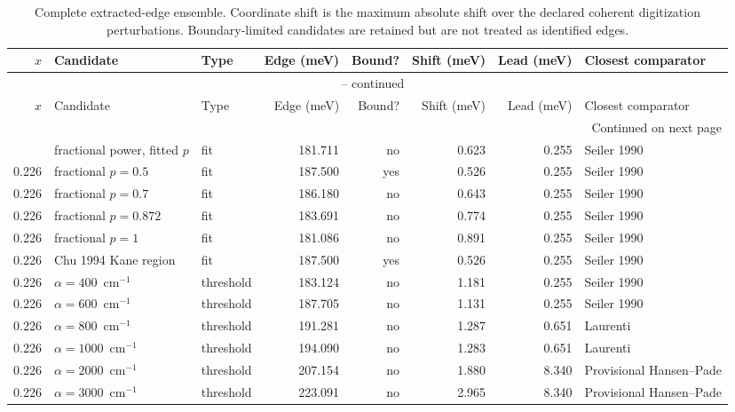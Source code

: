 \begin{landscape}
\begingroup
\scriptsize
\renewcommand{\arraystretch}{0.95}
\setlength{\tabcolsep}{3pt}
\setlength{\LTleft}{0pt}
\setlength{\LTright}{0pt}
\begin{longtable}{@{}rp{1.70in}p{0.65in}rrrrp{1.50in}@{}}
\caption{Complete extracted-edge ensemble. Coordinate shift is the maximum absolute shift over the declared coherent digitization perturbations. Boundary-limited candidates are retained but are not treated as identified edges.}\label{tab:edge-ensemble}\\
\toprule
$x$ & Candidate & Type & Edge (meV) & Bound? & Shift (meV) & Lead (meV) & Closest comparator \\
\midrule
\endfirsthead
\multicolumn{8}{c}{\tablename\ \thetable{} -- continued}\\
\toprule
$x$ & Candidate & Type & Edge (meV) & Bound? & Shift (meV) & Lead (meV) & Closest comparator \\
\midrule
\endhead
\midrule
\multicolumn{8}{r}{Continued on next page}\\
\endfoot
\bottomrule
\endlastfoot
0.226 & fractional power, fitted $p$ & fit & 181.711 & no & 0.623 & 0.255 & Seiler 1990 \\
0.226 & fractional $p=0.5$ & fit & 187.500 & yes & 0.526 & 0.255 & Seiler 1990 \\
0.226 & fractional $p=0.7$ & fit & 186.180 & no & 0.643 & 0.255 & Seiler 1990 \\
0.226 & fractional $p=0.872$ & fit & 183.691 & no & 0.774 & 0.255 & Seiler 1990 \\
0.226 & fractional $p=1$ & fit & 181.086 & no & 0.891 & 0.255 & Seiler 1990 \\
0.226 & Chu 1994 Kane region & fit & 187.500 & yes & 0.526 & 0.255 & Seiler 1990 \\
0.226 & $\alpha=400$~cm$^{-1}$ & threshold & 183.124 & no & 1.181 & 0.255 & Seiler 1990 \\
0.226 & $\alpha=600$~cm$^{-1}$ & threshold & 187.705 & no & 1.131 & 0.255 & Seiler 1990 \\
0.226 & $\alpha=800$~cm$^{-1}$ & threshold & 191.281 & no & 1.287 & 0.651 & Laurenti \\
0.226 & $\alpha=1000$~cm$^{-1}$ & threshold & 194.090 & no & 1.283 & 0.651 & Laurenti \\
0.226 & $\alpha=2000$~cm$^{-1}$ & threshold & 207.154 & no & 1.880 & 8.340 & Provisional Hansen--Pade \\
0.226 & $\alpha=3000$~cm$^{-1}$ & threshold & 223.091 & no & 2.965 & 8.340 & Provisional Hansen--Pade \\

\end{longtable}
\end{landscape}

